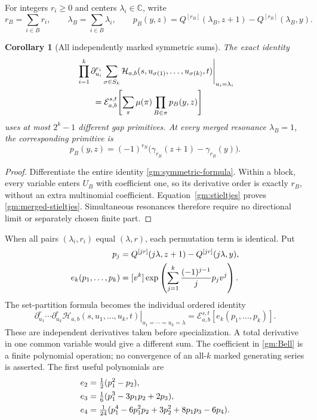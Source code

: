 \documentclass[11pt,a4paper]{article}
\numberwithin{equation}{section}
\newtheorem{corollary}[theorem]{Corollary}
\theoremstyle{definition}
\theoremstyle{remark}
\begin{document}
For integers \(r_i\ge0\) and centers \(\lambda_i\in\mathbb C\),
write
\[
 r_B=\sum_{i\in B}r_i,\qquad
 \lambda_B=\sum_{i\in B}\lambda_i,\qquad
 p_B(y,z)=Q^{[r_B]}(\lambda_B,z+1)
                              -Q^{[r_B]}(\lambda_B,y).
\]

\begin{corollary}[All independently marked symmetric sums]
\label{gm:marked}
The exact identity
\begin{align}\label{gm:marked-formula}
 &\left.\prod_{i=1}^k\partial_{u_i}^{r_i}
    \sum_{\sigma\in S_k}
      \mathcal H_{a,b}(s,u_{\sigma(1)},\ldots,u_{\sigma(k)},t)
                       \right|_{u_i=\lambda_i}\notag\\
 &\qquad=\mathcal E_{a,b}^{s,t}\!\left[
               \sum_\pi\mu(\pi)\prod_{B\in\pi}p_B(y,z)\right]
\end{align}
uses at most \(2^k-1\) different gap primitives.  At every merged
resonance \(\lambda_B=1\), the corresponding primitive is
\begin{equation}\label{gm:merged-stieltjes}
 p_B(y,z)=(-1)^{r_B}
                  \bigl(\gamma_{r_B}(z+1)-\gamma_{r_B}(y)\bigr).
\end{equation}
\end{corollary}

\begin{proof}
Differentiate the entire identity \eqref{gm:symmetric-formula}.
Within a block, every variable enters \(U_B\) with coefficient one,
so its derivative order is exactly \(r_B\), without an extra
multinomial coefficient.  Equation~\eqref{gm:stieltjes} proves
\eqref{gm:merged-stieltjes}.  Simultaneous resonances therefore require
no directional limit or separately chosen finite part.
\end{proof}

When all pairs \((\lambda_i,r_i)\) equal \((\lambda,r)\), each
permutation term is identical.  Put
\begin{align}\label{gm:Bell}
 p_j&=Q^{[jr]}(j\lambda,z+1)-Q^{[jr]}(j\lambda,y),\notag\\
 e_k(p_1,\ldots,p_k)
   &=[v^k]\exp\left(\sum_{j=1}^k\frac{(-1)^{j-1}}j p_jv^j\right).
\end{align}
The set-partition formula becomes the individual ordered identity
\begin{equation}\label{gm:identical}
 \left.\partial_{u_1}^r\cdots\partial_{u_k}^r
       \mathcal H_{a,b}(s,u_1,\ldots,u_k,t)
                         \right|_{u_1=\cdots=u_k=\lambda}
       =\mathcal E_{a,b}^{s,t}[e_k(p_1,\ldots,p_k)].
\end{equation}
These are independent derivatives taken before specialization.  A
total derivative in one common variable would give a different sum.
The coefficient in \eqref{gm:Bell} is a finite polynomial operation;
no convergence of an all-\(k\) marked generating series is asserted.
The first useful polynomials are
\begin{align}\label{gm:Bell-examples}
 e_2&=\tfrac12(p_1^2-p_2),\notag\\
 e_3&=\tfrac16(p_1^3-3p_1p_2+2p_3),\notag\\
 e_4&=\tfrac1{24}
       (p_1^4-6p_1^2p_2+3p_2^2+8p_1p_3-6p_4).
\end{align}
\end{document}
